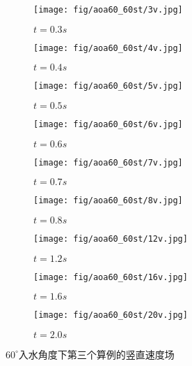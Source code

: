 \begin{figure}[!htp]
  \centering

  \begin{subfigure}{0.25\textwidth}
    \centering
    \texttt{[image: fig/aoa60\_60st/3v.jpg]}
    \caption{$t = 0.3s$}
  \end{subfigure}
  \hspace{1cm}
  \begin{subfigure}{0.25\textwidth}
    \centering
    \texttt{[image: fig/aoa60\_60st/4v.jpg]}
    \caption{$t = 0.4s$}
  \end{subfigure}
  \hspace{1cm}
  \begin{subfigure}{0.25\textwidth}
    \centering
    \texttt{[image: fig/aoa60\_60st/5v.jpg]}
    \caption{$t = 0.5s$}
  \end{subfigure}

  \quad

  \begin{subfigure}{0.25\textwidth}
    \centering
    \texttt{[image: fig/aoa60\_60st/6v.jpg]}
    \caption{$t = 0.6s$}
  \end{subfigure}
  \hspace{1cm}
  \begin{subfigure}{0.25\textwidth}
    \centering
    \texttt{[image: fig/aoa60\_60st/7v.jpg]}
    \caption{$t = 0.7s$}
  \end{subfigure}
  \hspace{1cm}
  \begin{subfigure}{0.25\textwidth}
    \centering
    \texttt{[image: fig/aoa60\_60st/8v.jpg]}
    \caption{$t = 0.8s$}
  \end{subfigure}

  \quad 

  \begin{subfigure}{0.25\textwidth}
    \centering
    \texttt{[image: fig/aoa60\_60st/12v.jpg]}
    \caption{$t = 1.2s$}
  \end{subfigure}
  \hspace{1cm}
  \begin{subfigure}{0.25\textwidth}
    \centering
    \texttt{[image: fig/aoa60\_60st/16v.jpg]}
    \caption{$t = 1.6s$}
  \end{subfigure}
  \hspace{1cm}
  \begin{subfigure}{0.25\textwidth}
    \centering
    \texttt{[image: fig/aoa60\_60st/20v.jpg]}
    \caption{$t = 2.0s$}
  \end{subfigure}

  \caption{$60^\circ$入水角度下第三个算例的竖直速度场}
  \label{fig:detail_v}
\end{figure}

